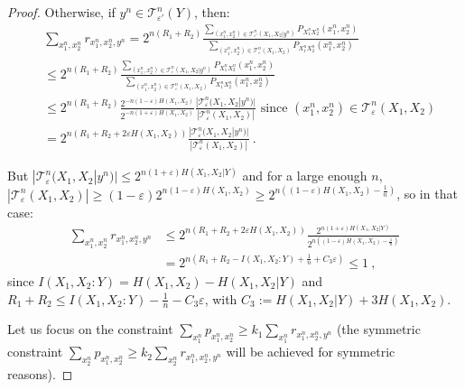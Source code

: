 \begin{proof}
    Otherwise, if $y^n \in \mathcal{T}^n_{\varepsilon'}(Y)$, then:
    \begin{equation}
      \begin{aligned}
        &\sum_{x_1^n,x_2^n} r_{x_1^n,x_2^n,y^n} = 2^{n(R_1+R_2)} \frac{\sum_{(x_1^n,x_2^n) \in \mathcal{T}^n_{\varepsilon'}(X_1,X_2|y^n)} P_{X_1^nX_2^n}(x_1^n,x_2^n)}{\sum_{(x_1^n,x_2^n) \in \mathcal{T}^n_{\varepsilon}(X_1,X_2)}P_{X_1^nX_2^n}(x_1^n,x_2^n)}\\
        &\leq 2^{n(R_1+R_2)} \frac{\sum_{(x_1^n,x_2^n) \in \mathcal{T}^n_{\varepsilon}(X_1,X_2|y^n)} P_{X_1^nX_2^n}(x_1^n,x_2^n)}{\sum_{(x_1^n,x_2^n) \in \mathcal{T}^n_{\varepsilon}(X_1,X_2)}P_{X_1^nX_2^n}(x_1^n,x_2^n)}\\
        &\leq 2^{n(R_1+R_2)}\frac{2^{-n(1-\varepsilon)H(X_1,X_2)}}{2^{-n(1+\varepsilon)H(X_1,X_2)}} \frac{|\mathcal{T}^n_{\varepsilon}(X_1,X_2|y^n)|}{|\mathcal{T}^n_{\varepsilon}(X_1,X_2)|} \text{ since $(x_1^n,x_2^n) \in \mathcal{T}^n_{\varepsilon}(X_1,X_2)$} \\
        &= 2^{n(R_1+R_2 + 2\varepsilon H(X_1,X_2))}\frac{|\mathcal{T}^n_{\varepsilon}(X_1,X_2|y^n)|}{|\mathcal{T}^n_{\varepsilon}(X_1,X_2)|} \ .
      \end{aligned}
    \end{equation}

    But $|\mathcal{T}^n_{\varepsilon}(X_1,X_2|y^n)| \leq 2^{n(1+\varepsilon)H(X_1,X_2|Y)}$ and for a large enough $n$, $|\mathcal{T}^n_{\varepsilon}(X_1,X_2)| \geq (1-\varepsilon)2^{n(1-\varepsilon)H(X_1,X_2)} \geq 2^{n\left((1-\varepsilon)H(X_1,X_2) - \frac{1}{n}\right)}$, so in that case:
    \begin{equation}
      \begin{aligned}
        \sum_{x_1^n,x_2^n} r_{x_1^n,x_2^n,y^n} &\leq 2^{n(R_1+R_2 + 2\varepsilon H(X_1,X_2))}\frac{2^{n(1+\varepsilon)H(X_1,X_2|Y)}}{2^{n\left((1-\varepsilon)H(X_1,X_2) - \frac{1}{n}\right)}}\\
        &= 2^{n\left(R_1+R_2 - I(X_1,X_2:Y) + \frac{1}{n} + C_3\varepsilon\right)} \leq 1 \ ,
      \end{aligned}
    \end{equation}
    since $I(X_1,X_2:Y) = H(X_1,X_2) - H(X_1,X_2|Y)$ and $R_1+R_2 \leq I(X_1,X_2:Y) - \frac{1}{n} - C_3\varepsilon$, with $C_3 := H(X_1,X_2|Y) + 3H(X_1,X_2)$.

    Let us focus on the constraint $\sum_{x_1^n} p_{x_1^n,x_2^n} \geq k_1 \sum_{x_1^n} r_{x_1^n,x_2^n,y^n}$ (the symmetric constraint $\sum_{x_2^n} p_{x_1^n,x_2^n} \geq k_2 \sum_{x_2^n} r_{x_1^n,x_2^n,y^n}$ will be achieved for symmetric reasons).


\end{proof}
